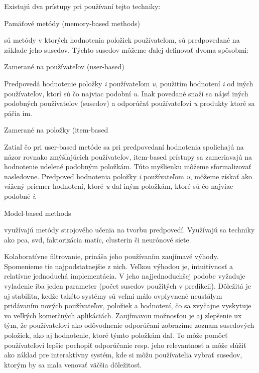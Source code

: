 Existujú dva prístupy pri používaní tejto techniky:
\begin{enumerate}
	{\bf \item Pamäťové metódy (memory-based methods)} sú metódy v ktorých hodnotenia položiek používateľom, sú predpovedané na základe jeho susedov. Týchto susedov môžeme ďalej definovať dvoma spôsobmi: \cite{rs3}
\begin{itemize}[leftmargin=*]
	{\bf \item Zamerané na používateľov (user-based)}\newline	
Predpovedá hodnotenie položky \textit{i} používateľom \textit{u}, použitím hodnotení \textit{i} od iných používateľov, ktorí sú čo najviac podobní \textit{u}. \cite{rs1} Inak povedané snaží sa nájsť iných podobných používateľov (susedov) a odporúčať používateľovi \textit{u} produkty ktoré sa páčia im.
	{\bf \item Zamerané na položky (item-based} \newline
Zatiaľ čo pri user-based metóde sa pri predpovedaní hodnotenia spoliehajú na názor rovnako zmýšľajúcich používateľov, item-based prístupy sa zameriavajú na hodnotenie udelené podobným položkám. Túto myšlienku môžeme sformalizovať nasledovne. Predpoveď hodnotenia položky \textit{i} používateľom \textit{u}, môžeme získať ako vážený priemer hodnotení, ktoré \textit{u} dal iným položkám, ktoré sú čo najviac podobné \textit{i}. \cite{rs1}
\end{itemize}
	{\bf \item Model-based methods} využívajú metódy strojového učenia na tvorbu predpovedí. Využívajú sa techniky ako \acrshort{pca}, \acrshort{svd}, faktorizácia matíc, clusterin či neurónové siete. \cite{rs3} \\
\end{enumerate}

Kolaboratívne filtrovanie, prináša jeho používaním zaujímavé výhody. Spomenieme tie najpodstatnejšie z nich. Veľkou výhodou je, intuitívnosť a relatívne jednoduchá implementácia. V jeho najjednoduchšej podobe vyžaduje vyladenie iba jeden parameter (počet susedov použitých v predikcii). Dôležitá je aj stabilita, keďže takéto systémy sú veľmi málo ovplyvnené neustálym pridávaním nových používateľov, položiek a hodnotení, čo sa zvyčajne vyskytuje vo veľkých komerčných aplikáciách.
Zaujímavou možnosťou je aj zlepšenie \acrshort{ux} tým, že používateľovi ako odôvodnenie odporúčaní zobrazíme zoznam susedových položiek, ako aj hodnotenie, ktoré týmto položkám dal. To môže pomôcť používateľovi lepšie pochopiť odporúčanie resp. jeho relevantnosť a môže slúžiť ako základ pre interaktívny systém, kde si môžu používatelia vybrať susedov, ktorým by sa mala venovať väčšia dôležitosť. \cite{rs1} \\


